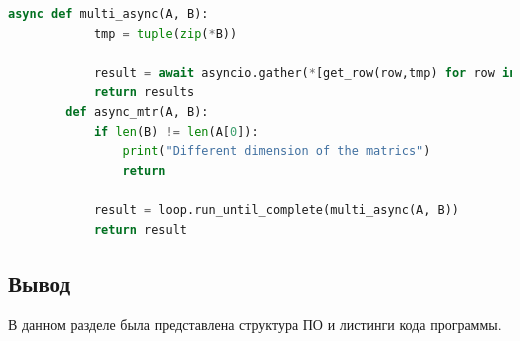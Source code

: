 \documentclass[a4paper, 12pt]{article}
\begin{document}
\begin{flushleft}
\begin{lstlisting}[language=Python, caption = Параллельный алгоритм умножения матриц]
		async def multi_async(A, B):
			tmp = tuple(zip(*B))
			
			result = await asyncio.gather(*[get_row(row,tmp) for row in A])
			return results
		def async_mtr(A, B):
			if len(B) != len(A[0]):
				print("Different dimension of the matrics")
				return
		
			result = loop.run_until_complete(multi_async(A, B))
			return result
	\end{lstlisting}
	
	\subsection{Вывод}
	\hspace*{5mm} В данном разделе была представлена структура ПО и листинги кода программы. 
	
\end{flushleft}

\newpage
\end{document}
